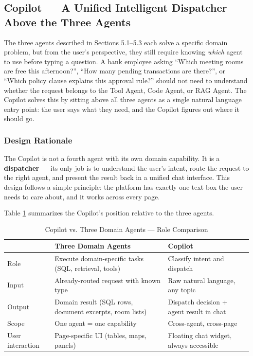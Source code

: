 \subsection{Copilot --- A Unified Intelligent Dispatcher Above the Three Agents}

The three agents described in Sections 5.1--5.3 each solve a specific domain problem, but from the user's perspective, they still require knowing \textit{which} agent to use before typing a question. A bank employee asking ``Which meeting rooms are free this afternoon?'', ``How many pending transactions are there?'', or ``Which policy clause explains this approval rule?'' should not need to understand whether the request belongs to the Tool Agent, Code Agent, or RAG Agent. The Copilot solves this by sitting above all three agents as a single natural language entry point: the user says what they need, and the Copilot figures out where it should go.

\subsubsection{Design Rationale}

The Copilot is not a fourth agent with its own domain capability. It is a \textbf{dispatcher} --- its only job is to understand the user's intent, route the request to the right agent, and present the result back in a unified chat interface. This design follows a simple principle: the platform has exactly one text box the user needs to care about, and it works across every page.

Table \ref{tab:copilot-vs-agents} summarizes the Copilot's position relative to the three agents.

\begin{table}[H]
\centering
\small\singlespacing
\caption{Copilot vs. Three Domain Agents --- Role Comparison}
\label{tab:copilot-vs-agents}
\begin{tabularx}{\textwidth}{>{\RaggedRight\arraybackslash}X>{\RaggedRight\arraybackslash}p{}>{\RaggedRight\arraybackslash}p{}}
\toprule
& \textbf{Three Domain Agents} & \textbf{Copilot} \\
\midrule
Role & Execute domain-specific tasks (SQL, retrieval, tools) & Classify intent and dispatch \\
Input & Already-routed request with known type & Raw natural language, any topic \\
Output & Domain result (SQL rows, document excerpts, room lists) & Dispatch decision + agent result in chat \\
Scope & One agent = one capability & Cross-agent, cross-page \\
User interaction & Page-specific UI (tables, maps, panels) & Floating chat widget, always accessible \\
\bottomrule
\end{tabularx}
\end{table}


